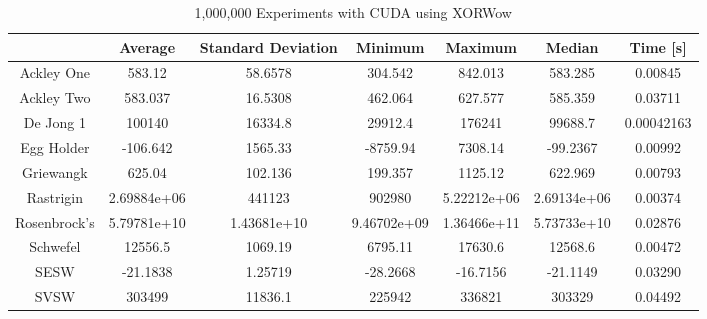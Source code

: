 \documentclass{article}
\begin{document}
        \begin{table}[h!]
            \begin{centering}
                \begin{tabular}{|c||c|c|c|c|c|c|}
                    \hline
                                & Average & Standard Deviation & Minimum & Maximum & Median & Time [s] \\
                    \hline
                    \hline
                    Ackley One & 583.12 & 58.6578 & 304.542 & 842.013 & 583.285 & 0.00845 \\
                    \hline
                    Ackley Two & 583.037 & 16.5308 & 462.064 & 627.577 & 585.359 & 0.03711 \\
                    \hline
                    De Jong 1 & 100140 & 16334.8 & 29912.4 & 176241 & 99688.7 & 0.00042163\\
                    \hline
                    Egg Holder & -106.642 & 1565.33 & -8759.94 & 7308.14 & -99.2367 & 0.00992 \\
                    \hline
                    Griewangk & 625.04 & 102.136 & 199.357 & 1125.12 & 622.969 & 0.00793 \\
                    \hline
                    Rastrigin & 2.69884e+06 & 441123 & 902980 & 5.22212e+06 & 2.69134e+06 & 0.00374 \\
                    \hline
                    Rosenbrock's & 5.79781e+10 & 1.43681e+10 & 9.46702e+09 & 1.36466e+11 & 5.73733e+10 & 0.02876\\
                    \hline
                    Schwefel & 12556.5 & 1069.19 & 6795.11 & 17630.6 & 12568.6 & 0.00472 \\
                    \hline
                    SESW & -21.1838 & 1.25719 & -28.2668 & -16.7156 & -21.1149 & 0.03290 \\
                    \hline
                    SVSW & 303499 & 11836.1 & 225942 & 336821 & 303329 & 0.04492 \\
                    \hline
                \end{tabular}
                \caption{1,000,000 Experiments with CUDA using XORWow}
            \end{centering}
            \end{table}
\end{document}

